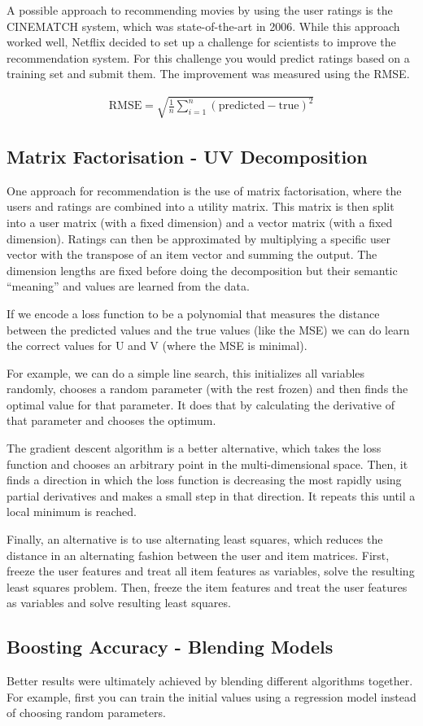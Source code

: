 A possible approach to recommending movies by using the user ratings
is the CINEMATCH system, which was state-of-the-art in 2006. While
this approach worked well, Netflix decided to set up a challenge for
scientists to improve the recommendation system.
For this challenge you would predict ratings based on a training set
and submit them. The improvement was measured using the RMSE.

\begin{definition}[RMSE]
  \begin{align*}
    \text{RMSE} = \sqrt{
      \frac{1}{n} \sum^n_{i=1} (
        \text{predicted} - \text{true}
      )^2
    }
  \end{align*}
\end{definition}

\subsection{Matrix Factorisation - UV Decomposition}

One approach for recommendation is the use of matrix factorisation,
where the users and ratings are combined into a utility matrix. This
matrix is then split into a user matrix (with a fixed dimension) and
a vector matrix (with a fixed dimension). Ratings can then be approximated
by multiplying a specific user vector with the transpose of an item vector
and summing the output. The dimension lengths are fixed before doing
the decomposition but their semantic ``meaning'' and values are learned
from the data.

If we encode a loss function to be a polynomial that measures the distance
between the predicted values and the true values (like the MSE) we can do
learn the correct values for U and V (where the MSE is minimal).

For example, we can do a simple line search, this initializes all variables
randomly, chooses a random parameter (with the rest frozen) and then finds the
optimal value for that parameter. It does that by calculating the derivative
of that parameter and chooses the optimum.

The gradient descent algorithm is a better alternative, which takes the loss
function and chooses an arbitrary point in the multi-dimensional space. Then,
it finds a direction in which the loss function is decreasing the most rapidly
using partial derivatives and makes a small step in that direction. It repeats
this until a local minimum is reached.

Finally, an alternative is to use alternating least squares, which reduces the
distance in an alternating fashion between the user and item matrices.
First, freeze the user features and treat all item features as variables,
solve the resulting least squares problem. Then, freeze the item features
and treat the user features as variables and solve resulting least squares.

\subsection{Boosting Accuracy - Blending Models}

Better results were ultimately achieved by blending different algorithms
together. For example, first you can train the initial values using a regression
model instead of choosing random parameters.

